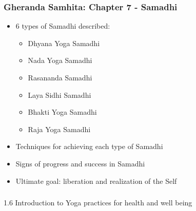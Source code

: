 \begin{frame}[fragile]\frametitle{Gheranda Samhita: Chapter 7 - Samadhi}
\begin{itemize}
    \item 6 types of Samadhi described:
    \begin{itemize}
        \item Dhyana Yoga Samadhi
        \item Nada Yoga Samadhi
        \item Rasananda Samadhi
        \item Laya Sidhi Samadhi
        \item Bhakti Yoga Samadhi
        \item Raja Yoga Samadhi
    \end{itemize}
    \item Techniques for achieving each type of Samadhi
    \item Signs of progress and success in Samadhi
    \item Ultimate goal: liberation and realization of the Self
\end{itemize}
\end{frame}


\begin{frame}[fragile]\frametitle{}
\begin{center}
{\Large 1.6 Introduction to Yoga practices for health and well being}
\end{center}
\end{frame}


